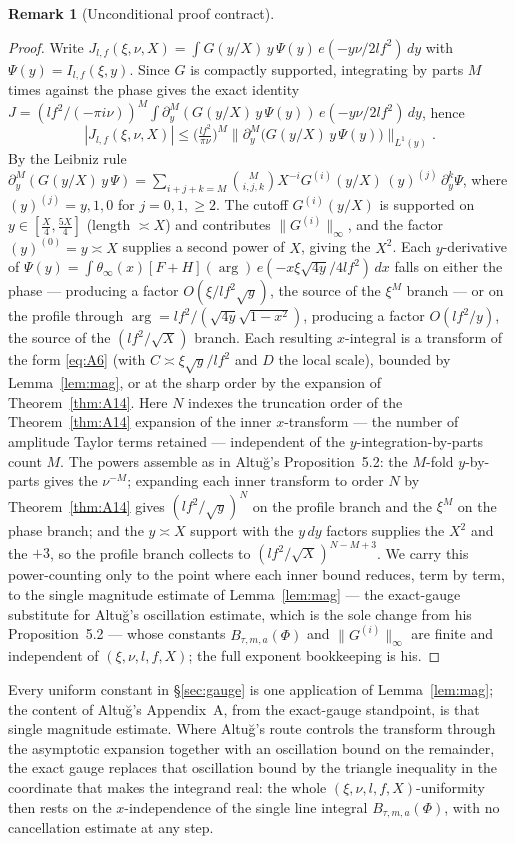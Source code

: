 \documentclass[11pt]{article}
\theoremstyle{definition}
\newtheorem{remark}[theorem]{Remark}
\begin{document}
\begin{remark}[Unconditional proof contract]
\begin{enumerate}
\begin{proof}
Write $J_{l,f}(\xi,\nu,X)=\int G(y/X)\,y\,\Psi(y)\,e(-y\nu/2lf^2)\,dy$ with $\Psi(y)=I_{l,f}(\xi,y)$.
Since $G$ is compactly supported, integrating by parts $M$ times against the phase gives the exact
identity $J=(lf^2/(-\pi i\nu))^M\int\partial_y^M(G(y/X)\,y\,\Psi(y))\,e(-y\nu/2lf^2)\,dy$, hence
\[
  |J_{l,f}(\xi,\nu,X)|\le\Big(\tfrac{lf^2}{\pi\nu}\Big)^{M}
    \big\|\partial_y^M\!\big(G(y/X)\,y\,\Psi(y)\big)\big\|_{L^1(y)} .
\]
By the Leibniz rule
$\partial_y^M(G(y/X)\,y\,\Psi)=\sum_{i+j+k=M}\binom{M}{i,j,k}X^{-i}G^{(i)}(y/X)\,(y)^{(j)}\,
\partial_y^k\Psi$, where $(y)^{(j)}=y,1,0$ for $j=0,1,\ge2$. The cutoff $G^{(i)}(y/X)$ is supported on
$y\in[\tfrac X4,\tfrac{5X}4]$ (length $\asymp X$) and contributes $\|G^{(i)}\|_\infty$, and the factor
$(y)^{(0)}=y\asymp X$ supplies a second power of $X$, giving the $X^2$. Each $y$-derivative of
$\Psi(y)=\int\theta_\infty(x)[F+H](\arg)\,e(-x\xi\sqrt{4y}/4lf^2)\,dx$ falls on either the phase ---
producing a factor $O(\xi/lf^2\sqrt y)$, the source of the $\xi^M$ branch --- or on the profile through
$\arg=lf^2/(\sqrt{4y}\sqrt{1-x^2})$, producing a factor $O(lf^2/y)$, the source of the $(lf^2/\sqrt
X)$ branch. Each resulting $x$-integral is a transform of the form \eqref{eq:A6} (with $C\asymp\xi\sqrt
y/lf^2$ and $D$ the local scale), bounded by Lemma~\ref{lem:mag}, or at the sharp order by the
expansion of Theorem~\ref{thm:A14}. Here $N$ indexes the truncation order of the Theorem~\ref{thm:A14} expansion of the inner $x$-transform --- the
number of amplitude Taylor terms retained --- independent of the $y$-integration-by-parts count $M$. The powers
assemble as in Altu\u{g}'s Proposition~5.2: the $M$-fold $y$-by-parts gives the $\nu^{-M}$; expanding each inner
transform to order $N$ by Theorem~\ref{thm:A14} gives $(lf^2/\sqrt y)^{N}$ on the profile branch and the $\xi^M$
on the phase branch; and the $y\asymp X$ support with the $y\,dy$ factors supplies the $X^2$ and the $+3$, so the
profile branch collects to $(lf^2/\sqrt X)^{N-M+3}$. We carry this power-counting only to the point where each
inner bound reduces, term by term, to the single magnitude estimate of Lemma~\ref{lem:mag} --- the exact-gauge
substitute for Altu\u{g}'s oscillation estimate, which is the sole change from his Proposition~5.2 --- whose
constants $B_{\tau,m,a}(\Phi)$ and $\|G^{(i)}\|_\infty$ are finite and independent of $(\xi,\nu,l,f,X)$; the full
exponent bookkeeping is his.
\end{proof}

Every uniform constant in \S\ref{sec:gauge} is one application of Lemma~\ref{lem:mag}; the content of
Altu\u{g}'s Appendix~A, from the exact-gauge standpoint, is that single magnitude estimate. Where
Altu\u{g}'s route controls the transform through the asymptotic expansion together with an oscillation
bound on the remainder, the exact gauge replaces that oscillation bound by the triangle inequality in
the coordinate that makes the integrand real: the whole $(\xi,\nu,l,f,X)$-uniformity then rests on the
$x$-independence of the single line integral $B_{\tau,m,a}(\Phi)$, with no cancellation estimate at any
step.


\end{enumerate}
\end{remark}
\end{document}
